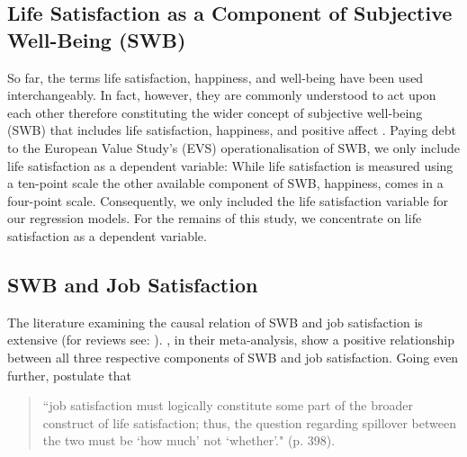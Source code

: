 \documentclass[preprint,12pt,authoryear]{elsarticle}
\begin{document}
	\subsection{Life Satisfaction as a Component of Subjective Well-Being (SWB)}
	So far, the terms life satisfaction, happiness, and well-being have been used interchangeably. In fact, however, they
	are commonly understood to act upon each other therefore constituting the wider concept of subjective well-being (SWB)
	that includes life satisfaction, happiness, and positive affect  \citep{bowling_meta-analytic_2010,diener_subjective_1984}. 
	Paying debt to the European Value Study’s (EVS) operationalisation of SWB, we only include life satisfaction as a
	dependent variable: While life satisfaction is measured using a ten-point scale the other available component of SWB,
	happiness, comes in a four-point scale. Consequently, we only included the life satisfaction variable for our regression
	models. For the remains of this study, we concentrate on life satisfaction as a dependent variable. 
	
	\subsection{SWB and Job Satisfaction}
	The literature examining the causal relation of SWB and job satisfaction is extensive
	(for reviews see: \citet{bowling_meta-analytic_2010,erdogan_whistle_2012}). \citet{bowling_meta-analytic_2010}, in their
	meta-analysis, show a positive relationship between all three respective components of SWB and job satisfaction.
	Going even further, \citet{near_job_1987} postulate that 
	\begin{quotation}
	“job satisfaction must logically constitute some part of the
	broader construct of life satisfaction; thus, the question regarding spillover between the two must be ‘how much’ not
	‘whether’." (p. 398). 
	\end{quotation} 
	
\end{document}
